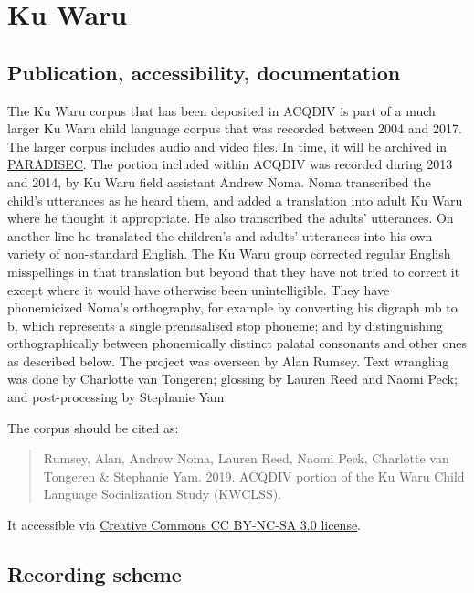 \documentclass[a4paper, 11pt]{book}
\begin{document}
\section{Ku Waru}
\label{sec:KuWaru}

\subsection{Publication, accessibility, documentation}

The Ku Waru corpus \citep{Rumsey_etal2019} that has been deposited in ACQDIV is part of a much larger Ku Waru child language corpus that was recorded between 2004 and 2017. The larger corpus includes audio and video files. In time, it will be archived in \href{http://www.paradisec.org.au/}{PARADISEC}. The portion included within ACQDIV was recorded during 2013 and 2014, by Ku Waru field assistant Andrew Noma. Noma transcribed the child's utterances as he heard them, and added a translation into adult Ku Waru where he thought it appropriate. He also transcribed the adults' utterances. On another line he translated the children’s and adults' utterances into his own variety of non-standard English. The Ku Waru group corrected regular English misspellings in that translation but beyond that they have not tried to correct it except where it would have otherwise been unintelligible. They have phonemicized Noma’s orthography, for example by converting his digraph mb to b, which represents a single prenasalised stop phoneme; and by distinguishing orthographically between phonemically distinct palatal consonants and other ones as described below. The project was overseen by Alan Rumsey. Text wrangling was done by Charlotte van Tongeren; glossing by Lauren Reed and Naomi Peck; and post-processing by Stephanie Yam.

The corpus should be cited as:

\begin{quote}
Rumsey, Alan, Andrew Noma, Lauren Reed, Naomi Peck, Charlotte van Tongeren \& Stephanie Yam. 2019. ACQDIV portion of the Ku Waru Child Language Socialization Study (KWCLSS).
\end{quote}

\noindent It accessible via \href{https://creativecommons.org/licenses/by-nc-sa/3.0/)}{Creative Commons CC BY-NC-SA 3.0 license}.

\subsection{Recording scheme}
\end{document}
